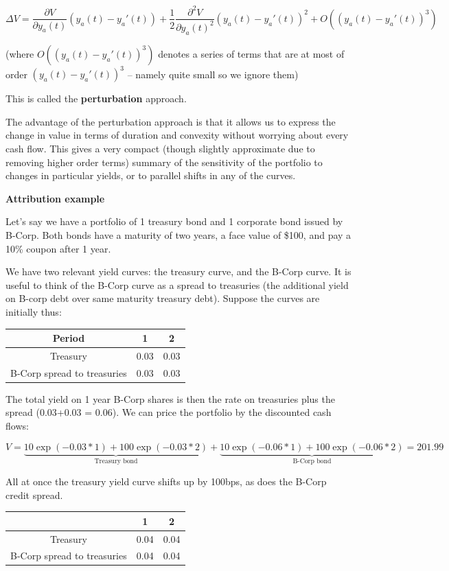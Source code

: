 \[ \Delta V = \frac{\partial V}{\partial y_a(t)}  (y_a(t)-y_a'(t)) + \frac{1}{2}\frac{\partial^2 V}{\partial y_a(t)^2} (y_a(t)-y_a'(t))^2 + O((y_a(t)-y_a'(t))^3) \]

(where $O((y_a(t)-y_a'(t))^3)$ denotes a series of terms that are at most of order $(y_a(t)-y_a'(t))^3$ -- namely quite small so we ignore them)

This is called the \textbf{perturbation} approach.

The advantage of the perturbation approach is that it allows us to express the change in value in terms of duration and convexity without worrying about every cash flow. This gives a very compact (though slightly approximate due to removing higher order terms) summary of the sensitivity of the portfolio to changes in particular yields, or to parallel shifts in any of the curves.

\textbf{Attribution example}

Let's say we have a portfolio of 1 treasury bond and 1 corporate bond issued by B-Corp. Both bonds have a maturity of two years, a face value of \$100, and pay a 10\% coupon after 1 year. 

We have two relevant yield curves: the treasury curve, and the B-Corp curve. It is useful to think of the B-Corp curve as a spread to treasuries (the additional yield on B-corp debt over same maturity treasury debt). Suppose the curves are initially thus:

\begin{tabular}{|c|c|c|}
\hline
 Period & 1 & 2\\
 \hline
Treasury & 0.03 & 0.03\\
B-Corp spread to treasuries & 0.03 & 0.03\\
\hline
\end{tabular}

The total yield on 1 year B-Corp shares is then the rate on treasuries plus the spread (0.03+0.03 = 0.06). We can price the portfolio by the discounted cash flows:

\[ V = \underbrace{10 \exp(-0.03*1)+ 100 \exp(-0.03*2)}_{\textrm{Treasury bond}} + \underbrace{10\exp(-0.06*1)+ 100 \exp(-0.06*2)}_{\textrm{B-Corp bond}} = 201.99\]

 All at once the treasury yield curve shifts up by 100bps, as does the B-Corp credit spread. 

\begin{tabular}{|c|c|c|}
\hline
 & 1 & 2\\
 \hline
Treasury & 0.04 & 0.04\\
B-Corp spread to treasuries & 0.04 & 0.04\\
\hline
\end{tabular}

